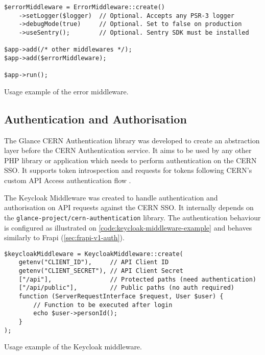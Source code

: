 \begin{listing}[htbp]
\begin{verbatim}
$errorMiddleware = ErrorMiddleware::create()
	->setLogger($logger)  // Optional. Accepts any PSR-3 logger
	->debugMode(true)     // Optional. Set to false on production
	->useSentry();        // Optional. Sentry SDK must be installed

$app->add(/* other middlewares */);
$app->add($errorMiddleware);

$app->run();
\end{verbatim}
\caption{Usage example of the error middleware.}
\end{listing}

\subsection{Authentication and Authorisation}
\label{sec:authentication-and-authorisation}

The Glance CERN Authentication library \cite{cern-authentication-lib} was developed to create an abstraction layer before the CERN Authentication service. It aims to be used by any other PHP library or application which needs to perform authentication on the CERN SSO. It supports token introspection \cite{oauth-token-introspection} \cite{cern-auth-lib-introspec-token} and requests for tokens following CERN's custom API Access authentication flow \cite{cern-auth-service-api-access} \cite{cern-auth-lib-api-access}.

The Keycloak Middleware \cite{keycloak-middleware} was created to handle authentication and authorisation on API requests against the CERN SSO. It internally depends on the \texttt{glance-project/cern-authentication} library. The authentication behaviour is configured as illustrated on \autoref{code:keycloak-middleware-example} and behaves similarly to Frapi (\autoref{sec:frapi-v1-auth}).

\begin{listing}[htbp]
\begin{verbatim}
$keycloakMiddleware = KeycloakMiddleware::create(
    getenv("CLIENT_ID"),     // API Client ID
    getenv("CLIENT_SECRET"), // API Client Secret
    ["/api"],                // Protected paths (need authentication)
    ["/api/public"],         // Public paths (no auth required)
    function (ServerRequestInterface $request, User $user) {
	    // Function to be executed after login
        echo $user->personId();
    }
);
\end{verbatim}
\caption{Usage example of the Keycloak middleware.}
\label{code:keycloak-middleware-example}
\end{listing}

